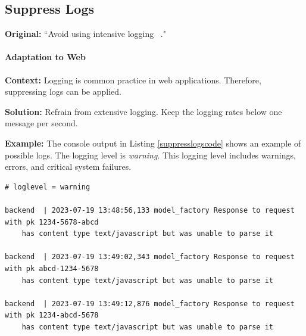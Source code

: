 \subsection{Suppress Logs} \label{sec:patterns-SuppressLogs}
\textbf{Original:} ``Avoid using intensive logging ~\cite{cruz2019catalog}."

\paragraph{Adaptation to Web}\mbox{}

\textbf{Context:} Logging is common practice in web applications. Therefore, suppressing logs can be applied.

\textbf{Solution:} Refrain from extensive logging. Keep the logging rates below one message per second.

\textbf{Example:} The console output in Listing \ref{suppresslogscode} shows an example of possible logs. The logging level is \textit{warning}. This logging level includes warnings, errors, and critical system failures.

\begin{minipage}{0.95\linewidth}
    \begin{lstlisting}[caption={Console log of an interaction with a web application on log level warning. Other logging levels include warnings, errors, and critical system failures.}, label={suppresslogscode}]
# loglevel = warning

backend  | 2023-07-19 13:48:56,133 model_factory Response to request with pk 1234-5678-abcd 
    has content type text/javascript but was unable to parse it

backend  | 2023-07-19 13:49:02,343 model_factory Response to request with pk abcd-1234-5678 
    has content type text/javascript but was unable to parse it

backend  | 2023-07-19 13:49:12,876 model_factory Response to request with pk 1234-abcd-5678 
    has content type text/javascript but was unable to parse it
    \end{lstlisting}
\end{minipage}

